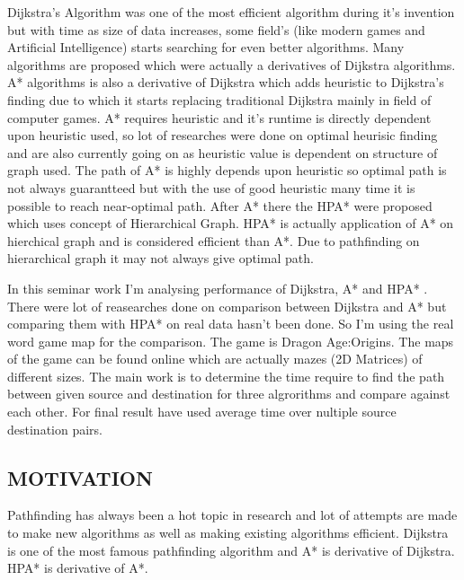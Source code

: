 \documentclass[a4paper, 12pt]{article}
\begin{document}
\par  Dijkstra's Algorithm was one of the most efficient algorithm during it's invention but with time as size of data increases, some field's (like modern games and Artificial Intelligence) starts searching for even better algorithms. Many algorithms are proposed which were actually a derivatives of Dijkstra algorithms.
A* algorithms is also a derivative of Dijkstra which adds heuristic to Dijkstra's finding due to which it starts replacing traditional Dijkstra 
mainly in field of computer games. A* requires heuristic and it's runtime is directly dependent upon heuristic used, so lot of researches were done on optimal heurisic finding and are also currently going on as heuristic value is dependent on structure of graph used. The path of A* is highly depends upon heuristic so optimal path is not always guarantteed but with the use of good heuristic many time it is possible to reach near-optimal path. After A* there the HPA* were proposed which uses concept of Hierarchical Graph. HPA* is actually application of A* on hierchical graph and is considered efficient than A*. Due to pathfinding on hierarchical graph it may not always give optimal path.
\\

\par
In this seminar work I'm analysing performance of Dijkstra, A* and HPA* . There were lot of reasearches done on comparison between Dijkstra and A* but comparing them with HPA* on real data hasn't been done. So I'm using the real word game map for the comparison. The game is Dragon Age:Origins. The maps of the game can be found online which are actually mazes (2D Matrices) of different sizes. The main work is to determine the time require to find the path between given source and destination for three algrorithms and compare against each other. For final result have used average time over nultiple source destination pairs.
\\


\newpage
\begin{center}

\section{MOTIVATION}

\end{center}

\hspace{1cm}
Pathfinding has always been a hot topic in research and lot of attempts are made to make new algorithms as well as making existing algorithms efficient. Dijkstra is one of the most famous pathfinding algorithm and A* is derivative of Dijkstra. HPA* is derivative of A*.
 \\
\end{document}

